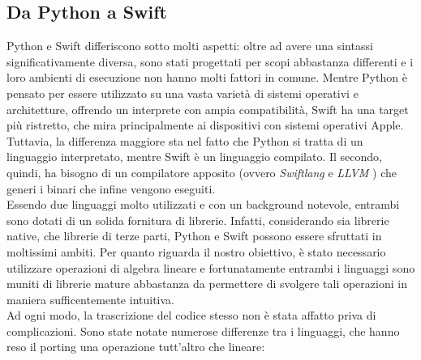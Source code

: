 \subsection{Da Python a Swift}

Python e Swift differiscono sotto molti aspetti: oltre ad avere una sintassi
significativamente diversa, sono stati progettati per scopi abbastanza 
differenti e i loro ambienti di esecuzione non hanno molti fattori 
in comune. Mentre Python è pensato per essere utilizzato su una vasta
varietà di sistemi operativi e architetture, offrendo un interprete
con ampia compatibilità, Swift ha una target più ristretto, che 
mira principalmente ai dispositivi con sistemi operativi Apple.
Tuttavia, la differenza maggiore sta nel fatto che Python si tratta
di un linguaggio interpretato, mentre Swift è un linguaggio compilato. 
Il secondo, quindi, ha bisogno di un compilatore apposito (ovvero \emph{Swiftlang} 
e \emph{LLVM} \cite{llvm_clang}) che generi
i binari che infine vengono eseguiti.\\
Essendo due linguaggi molto utilizzati e con un background notevole,
entrambi sono dotati di un solida fornitura di librerie. Infatti, 
considerando sia librerie native, che librerie di terze parti,
Python e Swift possono essere sfruttati in moltissimi ambiti.
Per quanto riguarda il nostro obiettivo, è stato necessario
utilizzare operazioni di algebra lineare e fortunatamente entrambi i
linguaggi sono muniti di librerie mature abbastanza da permettere di 
svolgere tali operazioni in maniera sufficentemente intuitiva.\\
Ad ogni modo, la trascrizione del codice stesso non è stata affatto
priva di complicazioni. Sono state notate numerose differenze tra i
linguaggi, che hanno reso il porting una operazione tutt'altro che 
lineare:
